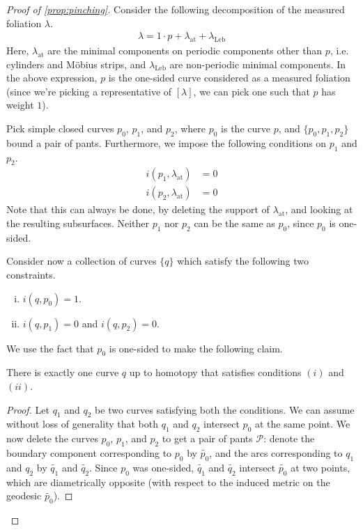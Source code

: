 \documentclass[12pt, reqno]{amsart}
\begin{document}
\begin{proof}[Proof of \autoref{prop:pinching}]
  Consider the following decomposition of the measured foliation $\lambda$.
  \begin{align*}
    \lambda = 1 \cdot p + \lambda_{\mathrm{at}} + \lambda_{\mathrm{Leb}}
  \end{align*}
  Here, $\lambda_{\mathrm{at}}$ are the minimal components on periodic components other than $p$, i.e. cylinders and Möbius strips, and $\lambda_{\mathrm{Leb}}$ are non-periodic minimal components.
  In the above expression, $p$ is the one-sided curve considered as a measured foliation (since we're picking a representative of $[\lambda]$, we can pick one such that $p$ has weight $1$).

  Pick simple closed curves $p_0$, $p_1$, and $p_2$, where $p_0$ is the curve $p$, and $\{p_0, p_1, p_2\}$ bound a pair of pants.
  Furthermore, we impose the following conditions on $p_1$ and $p_2$.
  \begin{align*}
    i(p_1, \lambda_{\mathrm{at}}) &= 0 \\
    i(p_2, \lambda_{\mathrm{at}}) &= 0
  \end{align*}
  Note that this can always be done, by deleting the support of $\lambda_{\mathrm{at}}$, and looking at the resulting subsurfaces.
  Neither $p_1$ nor $p_2$ can be the same as $p_0$, since $p_0$ is one-sided.

  Consider now a collection of curves $\{q\}$ which satisfy the following two constraints.
  \begin{enumerate}[(i)]
  \item $i(q, p_0) = 1$.
  \item $i(q, p_1) = 0$ and $i(q, p_2) = 0$.
  \end{enumerate}
  We use the fact that $p_0$ is one-sided to make the following claim.
  \begin{claim}
    \label{claim:one-sided-rigidity}
    There is exactly one curve $q$ up to homotopy that satisfies conditions $(i)$ and $(ii)$.
  \end{claim}
  \begin{proof}
    Let $q_1$ and $q_2$ be two curves satisfying both the conditions.
    We can assume without loss of generality that both $q_1$ and $q_2$ intersect $p_0$ at the same point.
    We now delete the curves $p_0$, $p_1$, and $p_2$ to get a pair of pants $\mathcal{P}$: denote the boundary component corresponding to $p_0$ by $\widetilde{p_0}$, and the arcs corresponding to $q_1$ and $q_2$ by $\widetilde{q_1}$ and $\widetilde{q_2}$.
    Since $p_0$ was one-sided, $\widetilde{q_1}$ and $\widetilde{q_2}$ intersect $\widetilde{p_0}$ at two points, which are diametrically opposite (with respect to the induced metric on the geodesic $\widetilde{p_0}$).


\end{proof}
\end{proof}
\end{document}
